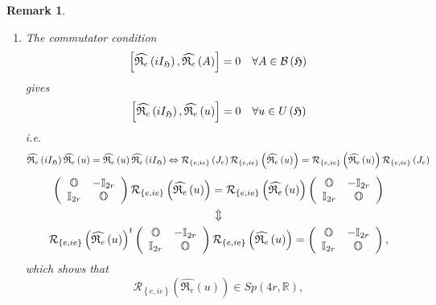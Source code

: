 \documentclass[aps,preprint]{revtex4}
\newtheorem{remark}[theorem]{Remark}
\begin{document}
\begin{remark}
\begin{enumerate}
\begin{enumerate}
\item The commutator condition 
\begin{equation}
\left[ \widehat{\mathfrak{R}_{e}}\left( iI_{\mathfrak{H}}\right) ,\widehat{%
\mathfrak{R}_{e}}\left( A\right) \right] =0\quad \forall A\in \mathcal{B}%
\left( \mathfrak{H}\right)
\end{equation}
gives%
\begin{equation}
\left[ \widehat{\mathfrak{R}_{e}}\left( iI_{\mathfrak{H}}\right) ,\widehat{%
\mathfrak{R}_{e}}\left( u\right) \right] =0\quad \forall u\in U\left( 
\mathfrak{H}\right)
\end{equation}%
i.e. 
\begin{equation}
\widehat{\mathfrak{R}_{e}}\left( iI_{\mathfrak{H}}\right) \widehat{\mathfrak{%
R}_{e}}\left( u\right) =\widehat{\mathfrak{R}_{e}}\left( u\right) \widehat{%
\mathfrak{R}_{e}}\left( iI_{\mathfrak{H}}\right) \Leftrightarrow \mathcal{R}%
_{\left\{ e,ie\right\} }\left( J_{e}\right) \mathcal{R}_{\left\{
e,ie\right\} }\left( \widehat{\mathfrak{R}_{e}}\left( u\right) \right) =%
\mathcal{R}_{\left\{ e,ie\right\} }\left( \widehat{\mathfrak{R}_{e}}\left(
u\right) \right) \mathcal{R}_{\left\{ e,ie\right\} }\left( J_{e}\right)
\end{equation}%
\begin{gather}
\left( 
\begin{array}{cc}
\mathbb{O} & -\mathbb{I}_{2r} \\ 
\mathbb{I}_{2r} & \mathbb{O}%
\end{array}%
\right) \mathcal{R}_{\left\{ e,ie\right\} }\left( \widehat{\mathfrak{R}_{e}}%
\left( u\right) \right) =\mathcal{R}_{\left\{ e,ie\right\} }\left( \widehat{%
\mathfrak{R}_{e}}\left( u\right) \right) \left( 
\begin{array}{cc}
\mathbb{O} & -\mathbb{I}_{2r} \\ 
\mathbb{I}_{2r} & \mathbb{O}%
\end{array}%
\right) \\
\Updownarrow \\
\mathcal{R}_{\left\{ e,ie\right\} }\left( \widehat{\mathfrak{R}_{e}}\left(
u\right) \right) ^{t}\left( 
\begin{array}{cc}
\mathbb{O} & -\mathbb{I}_{2r} \\ 
\mathbb{I}_{2r} & \mathbb{O}%
\end{array}%
\right) \mathcal{R}_{\left\{ e,ie\right\} }\left( \widehat{\mathfrak{R}_{e}}%
\left( u\right) \right) =\left( 
\begin{array}{cc}
\mathbb{O} & -\mathbb{I}_{2r} \\ 
\mathbb{I}_{2r} & \mathbb{O}%
\end{array}%
\right) ,
\end{gather}%
which shows that 
\begin{equation}
\mathcal{R}_{\left\{ e,ie\right\} }\left( \widehat{\mathfrak{R}_{e}}\left(
u\right) \right) \in Sp\left( 4r,\mathbb{R}\right) ,
\end{equation}


\end{enumerate}
\end{enumerate}
\end{remark}
\end{document}
